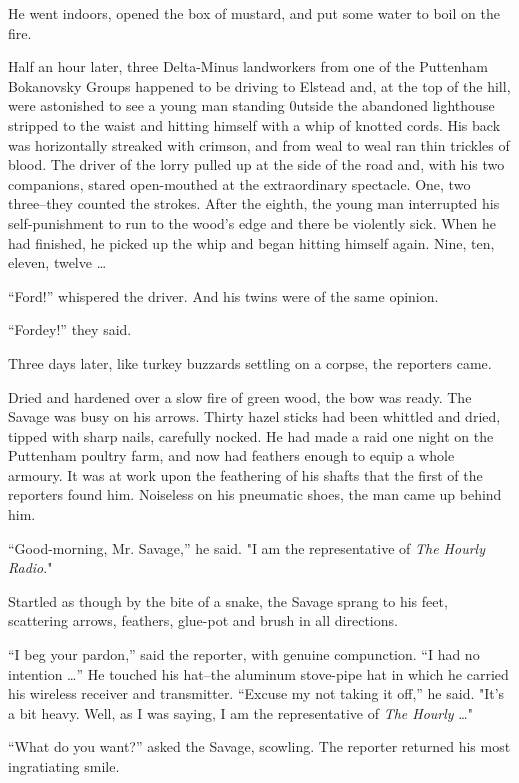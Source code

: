 \documentclass[12pt]{report}
\begin{document}
He went indoors, opened the box of mustard, and put some water to boil
on the fire.

Half an hour later, three Delta-Minus landworkers from one of the
Puttenham Bokanovsky Groups happened to be driving to Elstead and, at
the top of the hill, were astonished to see a young man standing 0utside
the abandoned lighthouse stripped to the waist and hitting himself with
a whip of knotted cords. His back was horizontally streaked with
crimson, and from weal to weal ran thin trickles of blood. The driver of
the lorry pulled up at the side of the road and, with his two
companions, stared open-mouthed at the extraordinary spectacle. One, two
three--they counted the strokes. After the eighth, the young man
interrupted his self-punishment to run to the wood's edge and there be
violently sick. When he had finished, he picked up the whip and began
hitting himself again. Nine, ten, eleven, twelve \ldots{}

``Ford!'' whispered the driver. And his twins were of the same opinion.

``Fordey!'' they said.

Three days later, like turkey buzzards settling on a corpse, the
reporters came.

Dried and hardened over a slow fire of green wood, the bow was ready.
The Savage was busy on his arrows. Thirty hazel sticks had been whittled
and dried, tipped with sharp nails, carefully nocked. He had made a raid
one night on the Puttenham poultry farm, and now had feathers enough to
equip a whole armoury. It was at work upon the feathering of his shafts
that the first of the reporters found him. Noiseless on his pneumatic
shoes, the man came up behind him.

``Good-morning, Mr. Savage,'' he said. "I am the representative of
\emph{The Hourly Radio}."

Startled as though by the bite of a snake, the Savage sprang to his
feet, scattering arrows, feathers, glue-pot and brush in all directions.

``I beg your pardon,'' said the reporter, with genuine compunction. ``I
had no intention \ldots{}'' He touched his hat--the aluminum stove-pipe
hat in which he carried his wireless receiver and transmitter. ``Excuse
my not taking it off,'' he said. "It's a bit heavy. Well, as I was
saying, I am the representative of \emph{The Hourly} \ldots{}"

``What do you want?'' asked the Savage, scowling. The reporter returned
his most ingratiating smile.
\end{document}
